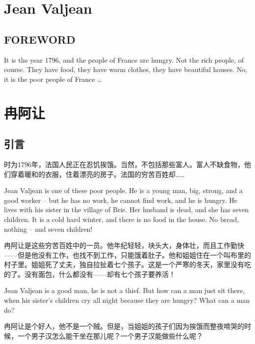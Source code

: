 \documentclass[fontset=ubuntu, zihao=5]{ctexart}
\begin{document}
\clearpage

\begin{paracol}{2}

  \section{Jean Valjean}

  \subsection*{FOREWORD}

  It is the year 1796, and the people of France are hungry. Not the rich people, of course. They have food, they have warm clothes, they have beautiful houses. No, it is the poor people of France \ldots{}

  \switchcolumn

  \section*{冉阿让}
  \subsection*{引言}

  时为1796年，法国人民正在忍饥挨饿。当然，不包括那些富人。富人不缺食物，他们穿着暖和的衣服，住着漂亮的房子。法国的穷苦百姓却……

  \switchcolumn*

  Jean Valjean is one of these poor people. He is a young man, big, strong, and a good worker – but he has no work, he cannot find work, and he is hungry. He lives with his sister in the village of Brie. Her husband is dead, and she has seven children. It is a cold hard winter, and there is no food in the house. No bread, nothing – and seven children!

  \switchcolumn
  冉阿让是这些穷苦百姓中的一员。他年纪轻轻，块头大，身体壮，而且工作勤快——但是他没有工作，也找不到工作，只能饿着肚子。他和姐姐住在一个叫布里的村子里。姐姐死了丈夫，独自拉扯着七个孩子。这是一个严寒的冬天，家里没有吃的了。没有面包，什么都没有——却有七个孩子要养活！

  \switchcolumn*

  Jean Valjean is a good man, he is not a thief. But how can a man just sit there, when his sister's children cry all night because they are hungry? What can a man do?

  \switchcolumn

  冉阿让是个好人，他不是一个贼。但是，当姐姐的孩子们因为挨饿而整夜啼哭的时候，一个男子汉怎么能干坐在那儿呢？一个男子汉能做些什么呢？


\end{paracol}
\end{document}
